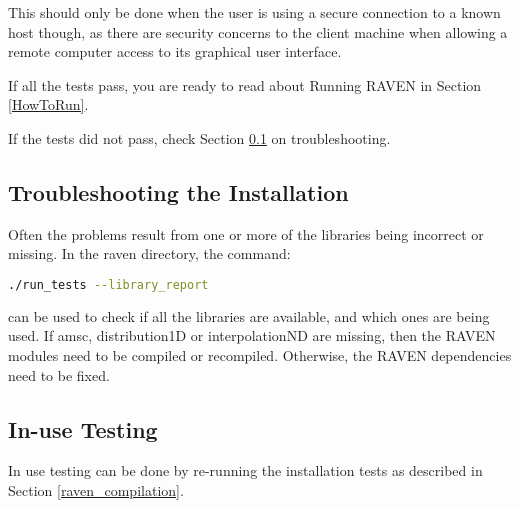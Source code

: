 This should only be done when the user is using a secure connection to a known
host though, as there are security concerns to the client machine when allowing
a remote computer access to its graphical user interface.

If all the tests pass, you are ready to read about Running RAVEN in
Section \ref{HowToRun}.

If the tests did not pass, check Section
\ref{troubleshooting_installation} on troubleshooting.

\subsection{Troubleshooting the Installation}
\label{troubleshooting_installation}

Often the problems result from one or more of the libraries being
incorrect or missing.  In the raven directory, the command:

\begin{lstlisting}[language=bash]
./run_tests --library_report
\end{lstlisting}
can be used to check if all the libraries are available, and which
ones are being used.  If amsc, distribution1D or interpolationND are
missing, then the RAVEN modules need to be compiled or recompiled.
Otherwise, the RAVEN dependencies need to be fixed.

\subsection{In-use Testing}

In use testing can be done by re-running the installation tests as
described in Section \ref{raven_compilation}.
